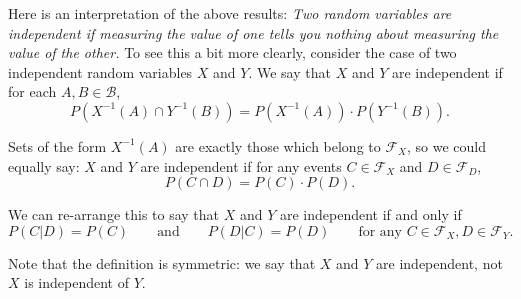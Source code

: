 \documentclass[a4paper]{scrartcl}
\theoremstyle{definition}
\theoremstyle{plain}
\theoremstyle{remark}
\begin{document}
Here is an interpretation of the above results: \emph{Two random variables are independent if measuring the value of one tells you nothing about measuring the value of the other.} To see this a bit more clearly, consider the case of two independent random variables $X$ and $Y$. We say that $X$ and $Y$ are independent if for each $A, B \in \mathcal{B}$,
\begin{equation*}
  P\left( X^{-1}(A) \cap Y^{-1}(B) \right) = P\left( X^{-1}(A) \right)\cdot P\left( Y^{-1}(B) \right).
\end{equation*}

Sets of the form $X^{-1}(A)$ are exactly those which belong to $\mathcal{F}_{X}$, so we could equally say: $X$ and $Y$ are independent if for any events $C \in \mathcal{F}_{X}$ and $D \in \mathcal{F}_{D}$,
\begin{equation*}
  P(C \cap D) = P(C)\cdot P(D).
\end{equation*}

We can re-arrange this to say that $X$ and $Y$ are independent if and only if
\begin{equation*}
  P(C | D) = P(C)\qquad\text{and}\qquad P(D |C) = P(D)\qquad\text{for any }C \in \mathcal{F}_{X}, D \in \mathcal{F}_{Y}.
\end{equation*}

Note that the definition is symmetric: we say that $X$ and $Y$ are independent, not $X$ is independent of $Y$.
\end{document}
